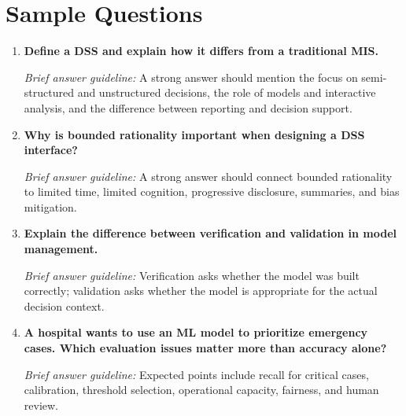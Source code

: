 \section*{Sample Questions}

\begin{enumerate}[label=\textbf{Q\arabic*.}]
  \item \textbf{Define a DSS and explain how it differs from a traditional MIS.}

  \textit{Brief answer guideline:} A strong answer should mention the focus on
  semi-structured and unstructured decisions, the role of models and interactive
  analysis, and the difference between reporting and decision support.

  \item \textbf{Why is bounded rationality important when designing a DSS
  interface?}

  \textit{Brief answer guideline:} A strong answer should connect bounded
  rationality to limited time, limited cognition, progressive disclosure,
  summaries, and bias mitigation.

  \item \textbf{Explain the difference between verification and validation in
  model management.}

  \textit{Brief answer guideline:} Verification asks whether the model was built
  correctly; validation asks whether the model is appropriate for the actual
  decision context.

  \item \textbf{A hospital wants to use an ML model to prioritize emergency
  cases. Which evaluation issues matter more than accuracy alone?}

  \textit{Brief answer guideline:} Expected points include recall for critical
  cases, calibration, threshold selection, operational capacity, fairness, and
  human review.
\end{enumerate}
